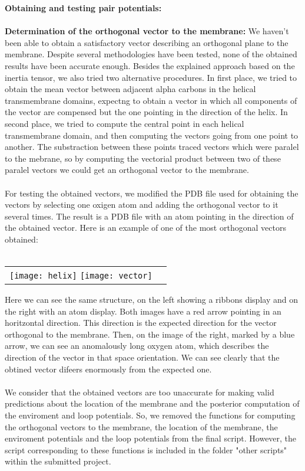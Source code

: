 \documentclass[12pt,titlepage]{article}
\theoremstyle{supercalifragilisticexpialidocious}
\begin{document}
\textbf{Obtaining and testing pair potentials: }
\\ \\
\textbf{Determination of the orthogonal vector to the membrane: } We haven't been able to obtain a satisfactory vector describing an orthogonal plane to the membrane. Despite several methodologies have been tested, none of the obtained results have been accurate enough. Besides the explained approach based on the inertia tensor, we also tried two alternative procedures. In first place, we tried to obtain the mean vector between adjacent alpha carbons in the helical transmembrane domains, expectng to obtain a vector in which all components of the vector are compensed but the one pointing in the direction of the helix. In second place, we tried to compute the central point in each helical transmembrane domain, and then computing the vectors going from one point to another. The substraction between these points traced vectors which were paralel to the mebrane, so by computing the vectorial product between two of these paralel vectors we could get an orthogonal vector to the membrane.
\\ \\
For testing the obtained vectors, we modified the PDB file used for obtaining the vectors by selecting one oxigen atom and adding the orthogonal vector to it several times. The result is a PDB file with an atom pointing in the direction of the obtained vector. Here is an example of one of the most orthogonal vectors obtained:
\\ \\
\begin{center}
\begin{tabular}{c c}
\texttt{[image: helix]}
\texttt{[image: vector]}  
\end{tabular}
\end{center}

Here we can see the same structure, on the left showing a ribbons display and on the right with an atom display. Both images have a red arrow pointing in an horitzontal direction. This direction is the expected direction for the vector orthogonal to the membrane. Then, on the image of the right, marked by a blue arrow, we can see an anomalously long oxygen atom, which describes the direction of the vector in that space orientation. We can see clearly that the obtined vector difeers enormously from the expected one. 
\\ \\
We consider that the obtained vectors are too unaccurate for making valid predictions about the location of the membrane and the posterior computation of the enviroment and loop potentials. So, we removed the functions for computing the orthogonal vectors to the membrane, the location of the membrane, the enviroment potentials and the loop potentials from the final script. However, the script corresponding to these functions is included in the folder "other scripts" within the submitted project. 
\end{document}
